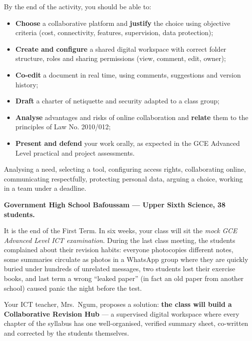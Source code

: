 \documentclass[11pt]{article}
\newcommand{\cle}[1]{{\popxbold\color{popdark}#1}}
\newcounter{popsec}
\newcounter{popsub}
\newcommand{\courssub}[1]{%
  \stepcounter{popsub}%
  \par\vspace{9pt}\noindent{\popxbold\fontsize{11.5}{13}\selectfont\color{popink}{\color{poporange}\thepopsec.\thepopsub}\hspace{6pt}#1}\par\nopagebreak\vspace{4pt}
}
\begin{document}
By the end of the activity, you should be able to:
\begin{itemize}
\item \textbf{Choose} a collaborative platform and \textbf{justify} the choice using objective criteria (cost, connectivity, features, supervision, data protection);
\item \textbf{Create and configure} a shared digital workspace with correct folder structure, roles and \cle{sharing permissions} (view, comment, edit, owner);
\item \textbf{Co-edit} a document in real time, using comments, suggestions and \cle{version history};
\item \textbf{Draft} a charter of netiquette and security adapted to a class group;
\item \textbf{Analyse} advantages and risks of online collaboration and \textbf{relate} them to the principles of Law No. 2010/012;
\item \textbf{Present and defend} your work orally, as expected in the GCE Advanced Level practical and project assessments.
\end{itemize}

\begin{aretenir}
Analysing a need, selecting a tool, configuring access rights, collaborating online, communicating respectfully, protecting personal data, arguing a choice, working in a team under a deadline.
\end{aretenir}

\courssub{Situation}

\textbf{Government High School Bafoussam — Upper Sixth Science, 38 students.}\par
It is the end of the First Term. In six weeks, your class will sit the \emph{mock GCE Advanced Level ICT examination}. During the last class meeting, the students complained about their revision habits: everyone photocopies different notes, some summaries circulate as photos in a WhatsApp group where they are quickly buried under hundreds of unrelated messages, two students lost their exercise books, and last term a wrong ``leaked paper'' (in fact an old paper from another school) caused panic the night before the test.

Your ICT teacher, Mrs.\ Ngum, proposes a solution: \textbf{the class will build a Collaborative Revision Hub} — a supervised digital workspace where every chapter of the syllabus has one well-organised, verified summary sheet, co-written and corrected by the students themselves.
\end{document}
